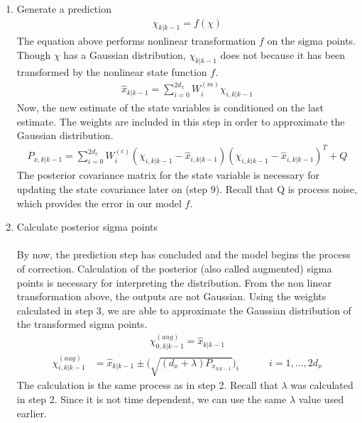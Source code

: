 \begin{enumerate}
           
        \item Generate a prediction
        \begin{align*}
        \chi_{k | k - 1} = f(\chi)
        \end{align*}
        The equation above performs nonlinear transformation $f$ on the sigma points. Though $\chi$ has a Gaussian distribution,  $ \chi_{k | k - 1} $ does not because it has been transformed by the nonlinear state function $f$.
        \begin{align*}
        \hat x_{k | k-1} = \sum^{2d_x}_{i = 0} W_i^{(m)} \chi_{i, k | k - 1}
        \end{align*}
        Now, the new estimate of the state variables is conditioned on the last estimate. The weights are included in this step in order to approximate the Gaussian distribution.
        \begin{align*}
        P_{x, k | k-1} = \sum^{2d_x}_{i = 0} W_i^{(c)} (\chi_{i, k | k - 1} -  \hat x_{i, k | k - 1} )(\chi_{i, k | k - 1} -  \hat x_{i, k | k - 1} )^T + Q
        \end{align*} 
        The posterior covariance matrix for the state variable is necessary for updating the state covariance later on (step 9). Recall that Q is process noise, which provides the error in our model $f$.
        \item Calculate posterior sigma points \\ \\
        By now, the prediction step has concluded and the model begins the process of correction. Calculation of the posterior (also called augmented) sigma points is necessary for interpreting the distribution. From the non linear transformation above, the outputs are not Gaussian. Using the weights calculated in step 3, we are able to approximate the Gaussian distribution of the transformed sigma points.
         \begin{align*}
        \chi^{(aug)}_{0, k|k-1} = \hat x_{k|k-1}
        \end{align*}
         \begin{align*}
        \chi^{(aug)}_{ i,k |k-1} &= \hat{x}_{k |k-1} \pm \bigg(\sqrt{(d_{x}+\lambda)P_{x_{k |k-1}}} \bigg)_{i} \quad \quad \quad  i=1,\dots,2d_{x}
        \end{align*}
        The calculation is the same process as in step 2. Recall that $\lambda$ was calculated in step 2. Since it is not time dependent, we can use the same $\lambda$ value used earlier.
        

\end{enumerate}
